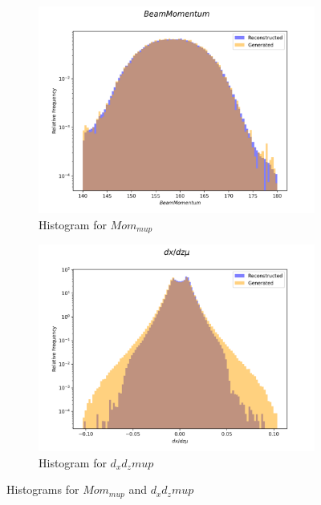 \documentclass{article}
\begin{document}
\begin{figure}[H]
    \centering
    \begin{subfigure}[b]{0.45\textwidth}
        \includegraphics[width=\textwidth]{graphs/incl_Beam_Momentum.png}
        \caption{Histogram for $Mom_{mup}$}
        \label{fig:incl_Momentum_mup}
    \end{subfigure}
    \hfill
    \begin{subfigure}[b]{0.45\textwidth}
        \includegraphics[width=\textwidth]{graphs/incl_dx_dz_mu.png}
        \caption{Histogram for $d_xd_zmup$}
        \label{fig:incl_Angle_mu}
    \end{subfigure}
    \caption{Histograms for $Mom_{mup}$ and $d_xd_zmup$}
\end{figure}
\end{document}
